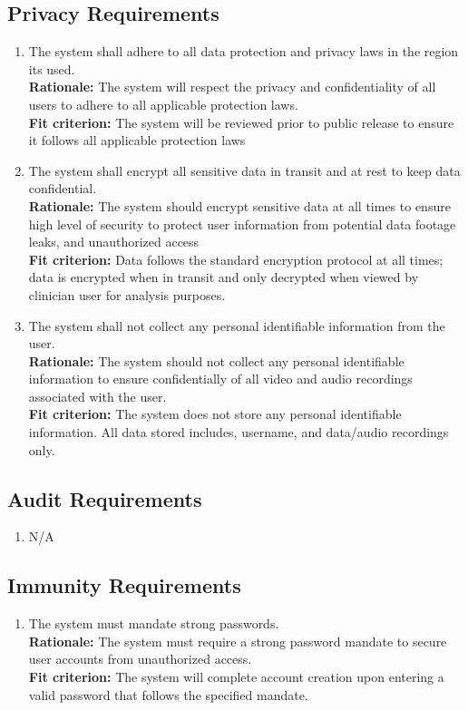 \documentclass[12pt]{article}
\begin{document}
\subsection{Privacy Requirements}
\begin{enumerate}[{SR-P}1. ]
  \item The system shall adhere to all data protection and privacy laws in the region its used.\\
  \textbf{Rationale: }The system will respect the privacy and confidentiality of all users to adhere to all applicable protection laws.\\
  \textbf{Fit criterion: }The system will be reviewed prior to public release to ensure it follows all applicable protection laws
  \item The system shall encrypt all sensitive data in transit and at rest to keep data confidential.\\
  \textbf{Rationale: }The system should encrypt sensitive data at all times to ensure high level of security to protect user information from potential data footage leaks, and unauthorized access \\
  \textbf{Fit criterion: }Data follows the standard encryption protocol at all times; data is encrypted when in transit and only decrypted when viewed by clinician user for analysis purposes.
  \item The system shall not collect any personal identifiable information from the user.\\
  \textbf{Rationale: }The system should not collect any personal identifiable information to ensure confidentially of all video and audio recordings associated with the user. \\
  \textbf{Fit criterion: }The system does not store any personal identifiable information. All data stored includes, username, and data/audio recordings only. 
\end{enumerate}
\subsection{Audit Requirements}
\begin{enumerate}[{SR-AU}1. ]
  \item N/A
\end{enumerate}
\subsection{Immunity Requirements}
\begin{enumerate}[{SR-IM}1. ]
  \item The system must mandate strong passwords.\\
  \textbf{Rationale: }The system must require a strong password mandate to secure user accounts from unauthorized access.\\
  \textbf{Fit criterion: }The system will complete account creation upon entering a valid password that follows the specified mandate. 
\end{enumerate}
\end{document}
